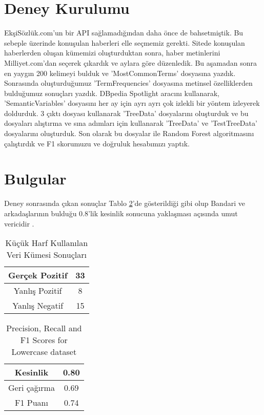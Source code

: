 \documentclass[conference]{IEEEtran}
\begin{document}
\section{Deney Kurulumu}
Ek\c{s}iSözlük.com'un bir API sa\u{g}lamad{\i}\u{g}{\i}ndan daha önce de bahsetmi\c{s}tik. Bu sebeple üzerinde konu\c{s}ulan haberleri elle se\c{c}memiz gerekti. Sitede konu\c{s}ulan haberlerden olu\c{s}an kümemizi olu\c{s}turduktan sonra, haber metinlerini Milliyet.com'dan se\c{c}erek \c{c}{\i}kard{\i}k ve aylara göre düzenledik. Bu a\c{s}amadan sonra en yayg{\i}n 200 kelimeyi bulduk ve 'MostCommonTerms' dosyas{\i}na yazd{\i}k. Sonras{\i}nda olu\c{s}turdu\u{g}umuz 'TermFrequencies' dosyas{\i}na metinsel özelliklerden buldu\u{g}umuz sonu\c{c}lar{\i} yazd{\i}k. DBpedia Spotlight arac{\i}n{\i} kullanarak, 'SemanticVariables' dosyas{\i}n{\i} her ay i\c{c}in ayr{\i} ayr{\i} \c{c}ok izlekli bir yöntem izleyerek doldurduk. 3 \c{c}{\i}kt{\i} dosyas{\i} kullanarak 'TreeData' dosyalar{\i}n{\i} olu\c{s}turduk ve bu dosyalar{\i} al{\i}\c{s}t{\i}rma ve s{\i}na ad{\i}mlar{\i} i\c{c}in kullanarak 'TreeData' ve 'TestTreeData' dosyalar{\i}n{\i} olu\c{s}turduk. Son olarak bu dosyalar ile Random Forest algoritmas{\i}n{\i} \c{c}al{\i}\c{s}t{\i}rd{\i}k ve F1 skorumuzu ve do\u{g}ruluk hesab{\i}m{\i}z{\i} yapt{\i}k.

\section{Bulgular}

Deney sonras{\i}nda \c{c}{\i}kan sonu\c{c}lar Tablo \ref{prf1_lc}'de gösterildi\u{g}i gibi olup Bandari ve arkada\c{s}lar{\i}n{\i}n buldu\u{g}u 0.8'lik kesinlik sonucuna yakla\c{s}mas{\i} a\c{c}{\i}s{\i}nda umut vericidir \cite{bandari_pulse_2012}.


\begin{table}[!t]
	\caption{Kü\c{c}ük Harf Kullan{\i}lan Veri Kümesi Sonu\c{c}lar{\i}}
	\label{test_result_lc}
	\centering
	\begin{tabular}{|c|c|}
		\hline
		Ger\c{c}ek Pozitif & 33 \\
		\hline
		Yanl{\i}\c{s} Pozitif & 8 \\
		\hline
		Yanl{\i}\c{s} Negatif & 15 \\
		\hline
	\end{tabular}
\end{table}
\begin{table}[!t]
	\caption{Precision, Recall and F1 Scores for Lowercase dataset}
	\label{prf1_lc}
	\centering
	\begin{tabular}{|c|c|}
		\hline
		Kesinlik & 0.80 \\
		\hline
		Geri \c{c}a\u{g}{\i}rma & 0.69 \\
		\hline
		F1 Puan{\i} & 0.74 \\
		\hline
	\end{tabular}
\end{table}
\end{document}
